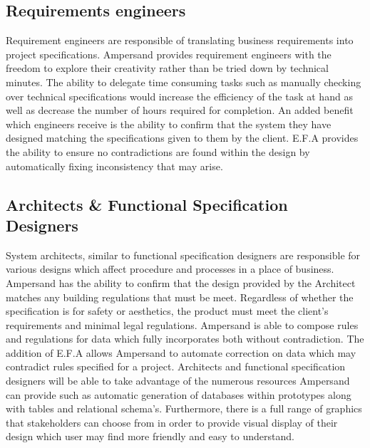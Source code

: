 \documentclass[12pt]{report}
\begin{document}
\subsection{Requirements engineers}\label{subsec:BusReq}
Requirement engineers are responsible of translating business 
requirements into project specifications. Ampersand provides requirement 
engineers with the freedom to explore their creativity rather than be tried 
down by technical minutes. The ability to delegate time consuming tasks such as 
manually checking over technical specifications would increase the efficiency 
of the task at hand as well as decrease the number of hours required for 
completion. An added benefit which engineers receive is the ability to confirm 
that the system they have designed matching the specifications given to them by 
the client. E.F.A provides the ability to ensure no contradictions are found 
within the design by automatically fixing inconsistency that may arise. 
\subsection{Architects \& Functional Specification Designers}
System architects, similar to functional specification designers are 
responsible for various designs which affect procedure and processes in a place 
of business. Ampersand has the ability to confirm that the design provided by 
the Architect matches any building regulations that must be meet. Regardless of 
whether the specification is for safety or aesthetics, the product must meet the 
client's requirements and minimal legal regulations. Ampersand is able to 
compose rules and regulations for data which fully incorporates both without 
contradiction. The addition of E.F.A allows Ampersand to automate correction  
on data which may contradict rules specified for a project. Architects and 
functional specification designers will be able to take advantage of the 
numerous resources Ampersand can provide such as automatic generation of 
databases within prototypes along with tables and relational schema's. 
Furthermore, there is a full range of graphics that stakeholders can choose 
from in order to provide visual display of their design which user may find 
more friendly and easy to understand. 
\end{document}
